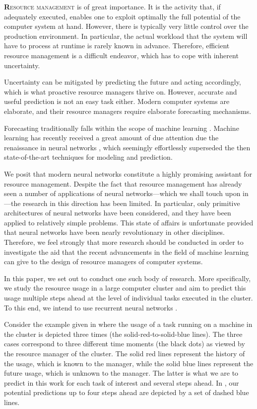 \lettrine[findent=0.2em, nindent=0em]{\textbf{R}}{esource management} is of
great importance. It is the activity that, if adequately executed, enables one
to exploit optimally the full potential of the computer system at hand. However,
there is typically very little control over the production environment. In
particular, the actual workload that the system will have to process at runtime
is rarely known in advance. Therefore, efficient resource management is a
difficult endeavor, which has to cope with inherent uncertainty.

Uncertainty can be mitigated by predicting the future and acting accordingly,
which is what proactive resource managers thrive on. However, accurate and
useful prediction is not an easy task either. Modern computer systems are
elaborate, and their resource managers require elaborate forecasting mechanisms.

Forecasting traditionally falls within the scope of machine learning
\cite{hastie2009}. Machine learning has recently received a great amount of due
attention due the renaissance in neural networks \cite{goodfellow2016}, which
seemingly effortlessly superseded the then state-of-the-art techniques for
modeling and prediction.

We posit that modern neural networks constitute a highly promising assistant for
resource management. Despite the fact that resource management has already seen
a number of applications of neural networks---which we shall touch upon in
---the research in this direction has been limited. In
particular, only primitive architectures of neural networks have been
considered, and they have been applied to relatively simple problems. This state
of affairs is unfortunate provided that neural networks have been nearly
revolutionary in other disciplines. Therefore, we feel strongly that more
research should be conducted in order to investigate the aid that the recent
advancements in the field of machine learning can give to the design of resource
managers of computer systems.

In this paper, we set out to conduct one such body of research. More
specifically, we study the resource usage in a large computer cluster and aim to
predict this usage multiple steps ahead at the level of individual tasks
executed in the cluster. To this end, we intend to use recurrent neural networks
\cite{goodfellow2016}.

Consider the example given in  where the  usage of a task
running on a machine in the cluster is depicted three times (the
solid-red-to-solid-blue lines). The three cases correspond to three different
time moments (the black dots) as viewed by the resource manager of the cluster.
The solid red lines represent the history of the usage, which is known to the
manager, while the solid blue lines represent the future usage, which is unknown
to the manager. The latter is what we are to predict in this work for each task
of interest and several steps ahead. In , our potential
predictions up to four steps ahead are depicted by a set of dashed blue lines.

